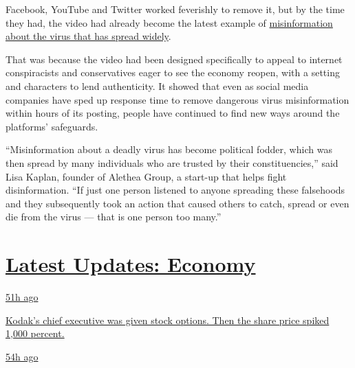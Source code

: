 Facebook, YouTube and Twitter worked feverishly to remove it, but by the
time they had, the video had already become the latest example of
\href{https://www.nytimes3xbfgragh.onion/2020/05/20/technology/plandemic-movie-youtube-facebook-coronavirus.html}{misinformation
about the virus that has spread widely}.

That was because the video had been designed specifically to appeal to
internet conspiracists and conservatives eager to see the economy
reopen, with a setting and characters to lend authenticity. It showed
that even as social media companies have sped up response time to remove
dangerous virus misinformation within hours of its posting, people have
continued to find new ways around the platforms' safeguards.

``Misinformation about a deadly virus has become political fodder, which
was then spread by many individuals who are trusted by their
constituencies,'' said Lisa Kaplan, founder of Alethea Group, a start-up
that helps fight disinformation. ``If just one person listened to anyone
spreading these falsehoods and they subsequently took an action that
caused others to catch, spread or even die from the virus --- that is
one person too many.''

\hypertarget{latest-updates-economy}{%
\section{\texorpdfstring{\href{https://www.nytimes3xbfgragh.onion/live/2020/07/31/business/stock-market-today-coronavirus?action=click\&pgtype=Article\&state=default\&region=MAIN_CONTENT_1\&context=storylines_live_updates}{Latest
Updates:
Economy}}{Latest Updates: Economy}}\label{latest-updates-economy}}

\href{https://www.nytimes3xbfgragh.onion/live/2020/07/31/business/stock-market-today-coronavirus?action=click\&pgtype=Article\&state=default\&region=MAIN_CONTENT_1\&context=storylines_live_updates\#kodaks-chief-executive-was-given-stock-options-then-the-share-price-spiked-1000-percent}{51h
ago}

\href{https://www.nytimes3xbfgragh.onion/live/2020/07/31/business/stock-market-today-coronavirus?action=click\&pgtype=Article\&state=default\&region=MAIN_CONTENT_1\&context=storylines_live_updates\#kodaks-chief-executive-was-given-stock-options-then-the-share-price-spiked-1000-percent}{Kodak's
chief executive was given stock options. Then the share price spiked
1,000 percent.}

\href{https://www.nytimes3xbfgragh.onion/live/2020/07/31/business/stock-market-today-coronavirus?action=click\&pgtype=Article\&state=default\&region=MAIN_CONTENT_1\&context=storylines_live_updates\#fitch-ratings-downgrades-its-outlook-on-us-debt}{54h
ago}

